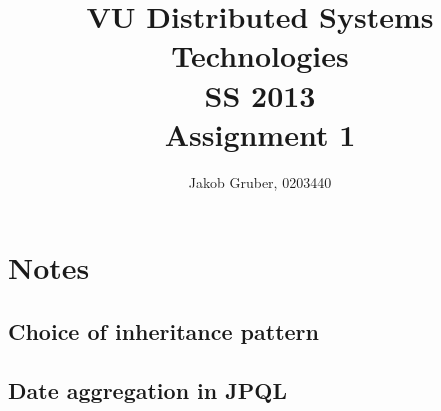 \documentclass[a4paper,10pt]{article}
\title{VU Distributed Systems Technologies \\
       SS 2013 \\
       Assignment 1}
\author{Jakob Gruber, 0203440}
\begin{document}
\maketitle

\section{Notes}

\subsection{Choice of inheritance pattern}

\begin{comment}
InheritanceType: JOINED; Common table for base type, additional infos stored 
separately. SINGLE_TABLE sounds nice for our needs, but support is optional.

MappedSuperclass: the superclass contains persisted information, but is not
mapped as an entity by the JPA provider. State & mapping information common to
multiple entity classes. Non-entity superclasses don't support persistence,
and abstract entities are mapped (which we don't need).
\end{comment}

\subsection{Date aggregation in JPQL}

\begin{comment}
JPQL does not support date aggregation in any reasonable form, which means we
can't do summation within the query. Extract all rows individually, then
create the sum within java code.
\end{comment}
\end{document}
